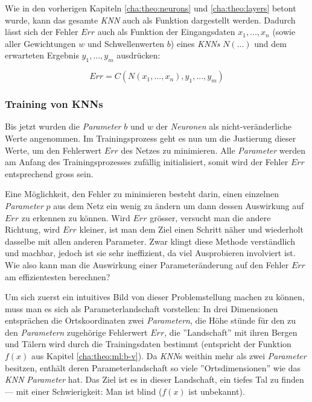 Wie in den vorherigen Kapiteln \ref{cha:theo:neurons} und \ref{cha:theo:layers} betont wurde, kann das gesamte \textit{KNN} auch als Funktion dargestellt werden. Dadurch lässt sich der Fehler $Err$ auch als Funktion der Eingangsdaten $x_1,...,x_n$ (sowie aller Gewichtungen $w$ und Schwellenwerten $b$) eines \textit{KNNs} $N(...)$ und dem erwarteten Ergebnis $y_1,...,y_m$  ausdrücken:

\begin{equation}\label{eq:err_func}
Err = C(N(x_1,...,x_n), y_1,...,y_m)
\end{equation}

\subsubsection{Training von KNNs}\label{cha:theo:backprop}
Bis jetzt wurden die \textit{Parameter} $b$ und $w$ der \textit{Neuronen} als nicht-veränderliche Werte angenommen. Im Trainingsprozess geht es nun um die Justierung dieser Werte, um den Fehlerwert $Err$ des Netzes zu minimieren. Alle \textit{Parameter} werden am Anfang des Trainingsprozesses zufällig initialisiert, somit wird der Fehler $Err$ entsprechend gross sein.

Eine Möglichkeit, den Fehler zu minimieren besteht darin, einen einzelnen \textit{Parameter} $p$ aus dem Netz ein wenig zu ändern um dann dessen Auswirkung auf $Err$ zu erkennen zu können. Wird $Err$ grösser, versucht man die andere Richtung, wird $Err$ kleiner, ist man dem Ziel einen Schritt näher und wiederholt dasselbe mit allen anderen Parameter. Zwar klingt diese Methode verständlich und machbar, jedoch ist sie sehr ineffizient, da viel Ausprobieren involviert ist. Wie also kann man die Auswirkung einer Parameteränderung auf den Fehler $Err$ am effizientesten berechnen?

Um sich zuerst ein intuitives Bild von dieser Problemstellung machen zu können, muss man es sich als Parameterlandschaft vorstellen: In drei Dimensionen entsprächen die Ortskoordinaten zwei \textit{Parametern}, die Höhe stünde für den zu den \textit{Parametern} zugehörige Fehlerwert $Err$, die ''Landschaft'' mit ihren Bergen und Tälern wird durch die Trainingsdaten bestimmt (entspricht der Funktion $f(x)$ aus Kapitel \ref{cha:theo:ml:b-v}). Da \textit{KNN}s weithin mehr als zwei \textit{Parameter} besitzen, enthält deren Parameterlandschaft so viele ''Ortsdimensionen'' wie das \textit{KNN} \textit{Parameter} hat. Das Ziel ist es in dieser Landschaft, ein tiefes Tal zu finden --- mit einer Schwierigkeit: Man ist blind ($f(x)$ ist unbekannt).

